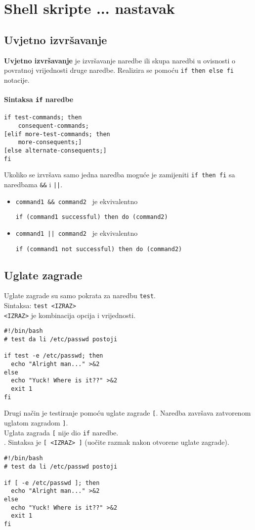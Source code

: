 \section*{Shell skripte ... nastavak}

\subsection*{Uvjetno izvršavanje}
\textbf{Uvjetno izvršavanje} je izvršavanje naredbe ili skupa naredbi u ovisnosti o povratnoj vrijednosti druge naredbe. Realizira se pomoću \texttt{if then else fi} notacije.

\paragraph{Sintaksa \texttt{if} naredbe}
\begin{lstlisting}
if test-commands; then
    consequent-commands;
[elif more-test-commands; then
    more-consequents;]
[else alternate-consequents;]
fi
\end{lstlisting}

Ukoliko se izvršava samo jedna naredba moguće je zamijeniti \texttt{if then fi} sa naredbama \texttt{\&\&} i \texttt{||}.
\begin{itemize}
 \item 
\lstinline!command1 && command2 ! je ekvivalentno 

\lstinline!if (command1 successful) then do (command2)!

\item \lstinline!command1 || command2 ! je ekvivalentno 

\lstinline!if (command1 not successful) then do (command2)!

\end{itemize}


\subsection*{Uglate zagrade}
Uglate zagrade su samo pokrata za naredbu \texttt{test}. 
\\
Sintaksa: \texttt{test <IZRAZ>}
\\
\texttt{<IZRAZ>} je kombinacija opcija i vrijednosti.
\begin{lstlisting}
#!/bin/bash
# test da li /etc/passwd postoji

if test -e /etc/passwd; then
  echo "Alright man..." >&2
else
  echo "Yuck! Where is it??" >&2
  exit 1
fi
\end{lstlisting}
Drugi način je testiranje pomoću uglate zagrade \texttt{[}. Naredba završava zatvorenom uglatom zagradom \texttt{]}. \\
Uglata zagrada \texttt{[} nije dio \texttt{if} naredbe.\\.
Sintaksa je \texttt{[ <IZRAZ> ]} (uočite razmak nakon otvorene uglate zagrade).
\begin{lstlisting}
#!/bin/bash
# test da li /etc/passwd postoji

if [ -e /etc/passwd ]; then
  echo "Alright man..." >&2
else
  echo "Yuck! Where is it??" >&2
  exit 1
fi
\end{lstlisting}


